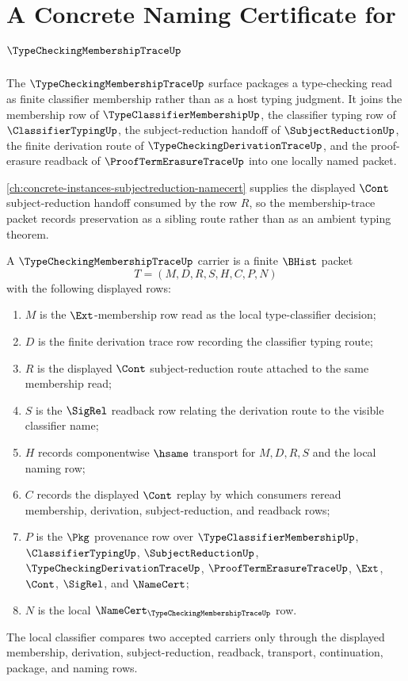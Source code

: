 \chapter{A Concrete Naming Certificate for $\TypeCheckingMembershipTraceUp$}
\label{ch:concrete-instances-typecheckingmembershiptrace-namecert}

The $\TypeCheckingMembershipTraceUp$ surface packages a type-checking read as finite classifier membership rather than as a host typing judgment. It joins the membership row of $\TypeClassifierMembershipUp$, the classifier typing row of $\ClassifierTypingUp$, the subject-reduction handoff of $\SubjectReductionUp$, the finite derivation route of $\TypeCheckingDerivationTraceUp$, and the proof-erasure readback of $\ProofTermErasureTraceUp$ into one locally named packet.

\autoref{ch:concrete-instances-subjectreduction-namecert} supplies the displayed $\Cont$ subject-reduction handoff consumed by the row $R$, so the membership-trace packet records preservation as a sibling route rather than as an ambient typing theorem.

\begin{definition}
\label{def:typechecking-membership-trace-carrier}
A $\TypeCheckingMembershipTraceUp$ carrier is a finite $\BHist$ packet
$$
T=(M,D,R,S,H,C,P,N)
$$
with the following displayed rows:
\begin{enumerate}
\item $M$ is the $\Ext$-membership row read as the local type-classifier decision;
\item $D$ is the finite derivation trace row recording the classifier typing route;
\item $R$ is the displayed $\Cont$ subject-reduction route attached to the same membership read;
\item $S$ is the $\SigRel$ readback row relating the derivation route to the visible classifier name;
\item $H$ records componentwise $\hsame$ transport for $M,D,R,S$ and the local naming row;
\item $C$ records the displayed $\Cont$ replay by which consumers reread membership, derivation, subject-reduction, and readback rows;
\item $P$ is the $\Pkg$ provenance row over $\TypeClassifierMembershipUp$, $\ClassifierTypingUp$, $\SubjectReductionUp$, $\TypeCheckingDerivationTraceUp$, $\ProofTermErasureTraceUp$, $\Ext$, $\Cont$, $\SigRel$, and $\NameCert$;
\item $N$ is the local $\NameCert_{\TypeCheckingMembershipTraceUp}$ row.
\end{enumerate}
The local classifier compares two accepted carriers only through the displayed membership, derivation, subject-reduction, readback, transport, continuation, package, and naming rows.
\end{definition}

